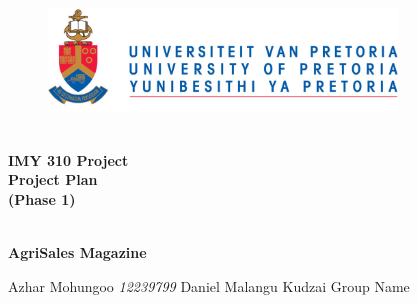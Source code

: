 \begin{titlepage}
	\begin{center}
		
		\begin{figure}[t]
			\centering
			\includegraphics[width=350px]{../Images/UP_Logo.png}
		\end{figure}
		
		\textsc{\large } \\ 
		\vspace{2cm}
		\textbf{\Huge IMY 310 Project  \\
			Project Plan \\
			(Phase 1)} \\ 

		\textsc{\large } \\ 
		\vspace{0.75cm}

		\textbf{\Large AgriSales Magazine} \\ 
		
		\begin{flushright} \large
			Azhar Mohungoo \emph{12239799} \newline
			Daniel Malangu \emph{} \newline
			Kudzai  	\emph{} \newline
			\newline
			Group Name  \emph{} \newline
			\end{flushright}
		
	\end{center}
\end{titlepage}
